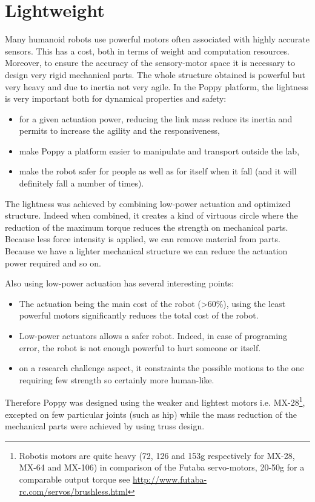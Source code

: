 \section{Lightweight} %

Many humanoid robots use powerful motors often associated with highly accurate sensors. This has a cost, both in terms of weight and computation resources. Moreover, to ensure the accuracy of the sensory-motor space it is necessary to design very rigid mechanical parts. The whole structure obtained is powerful but very heavy and due to inertia not very agile.
In the Poppy platform, the lightness is very important both for dynamical properties and safety:
\begin{itemize}
    \item for a given actuation power, reducing the link mass reduce its inertia and permits to increase the agility and the responsiveness,
    \item make Poppy a platform easier to manipulate and transport outside the lab,
    \item make the robot safer for people as well as for itself when it fall (and it will definitely fall a number of times).
\end{itemize}

The lightness was achieved by combining low-power actuation and optimized structure. Indeed when combined, it creates a kind of virtuous circle where the reduction of the maximum torque reduces the strength on mechanical parts. Because less force intensity is applied, we can remove material from parts. Because we have a lighter mechanical structure we can reduce the actuation power required and so on.

Also using low-power actuation has several interesting points:

\begin{itemize}
    \item The actuation being the main cost of the robot (>60\%), using the least powerful motors significantly reduces the total cost of the robot.
    \item Low-power actuators allows a safer robot. Indeed, in case of programing error, the robot is not enough powerful to hurt someone or itself.
    \item on a research challenge aspect, it constraints the possible motions to the one requiring few strength so certainly more human-like.
\end{itemize}

Therefore Poppy was designed using the weaker and lightest motors i.e. MX-28\footnote{Robotis motors are quite heavy (72, 126 and 153g respectively for MX-28, MX-64 and MX-106) in comparison of the Futaba servo-motors, 20-50g for a comparable output torque see \url{http://www.futaba-rc.com/servos/brushless.html}}, excepted on few particular joints (such as hip) while the mass reduction of the mechanical parts were achieved by using truss design.

